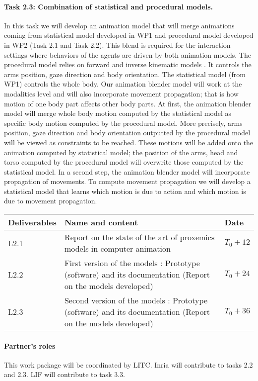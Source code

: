 \paragraph{Task 2.3:  Combination of statistical and procedural models.}

In this task we will develop an animation model that will merge animations coming from statistical model developed in WP1 and procedural model developed in WP2 (Task 2.1 and Task 2.2). This blend is required for the interaction settings where behaviors of the agents are driven by both animation models.  The procedural model relies on forward and inverse kinematic models \cite{huang:2012:EET}. It controls the arms position, gaze direction and body orientation. The statistical model (from WP1) controls the whole body.  Our animation blender model will work at the modalities level and will also incorporate movement propagation; that is how motion of one body part affects other body parts. At first, the animation blender model will merge whole body motion computed by the statistical model as specific body motion computed by the procedural model. More precisely, arms position, gaze direction and body orientation outputted by the procedural model will be viewed as constraints to be reached. These motions will be 
added onto the animation computed by statistical model; the position of the arms, head and torso computed by the procedural model will overwrite those computed by the statistical model. In a second step, the animation blender model will incorporate propagation of movements. To compute movement propagation we will develop a statistical model that learns which motion is due to action and which motion is due to movement propagation.

\vspace{5mm}

\begin{tabular}{|l|p{10cm}|l|}\hline
Deliverables & Name and content  & Date  \\\hline
L2.1  & Report on the state of the art of proxemics models in computer animation&   $T_0+12$  \\\hline
L2.2  &  First version of the models : Prototype (software) and its documentation (Report on the models developed) & $T_0+24$ \\\hline
L2.3  &  Second version of the models : Prototype (software) and its documentation (Report on the models developed) &  $T_0+36$ \\\hline
\end{tabular}

\paragraph{Partner's roles} This work package  will be coordinated by LITC. Inria  will contribute to tasks 2.2 and 2.3. LIF will contribute to task 3.3.
 
\endinput

